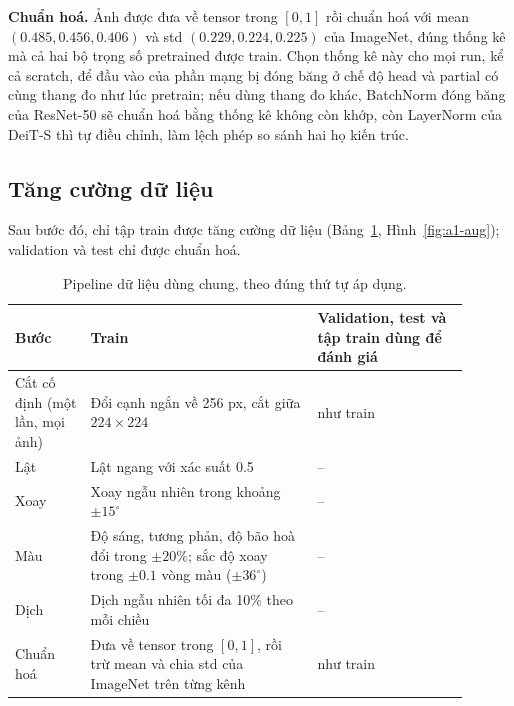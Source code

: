 \documentclass[a4paper,12pt]{article}
\begin{document}
\textbf{Chuẩn hoá.} Ảnh được đưa về tensor trong \([0,1]\) rồi chuẩn hoá với mean \((0.485, 0.456, 0.406)\) và std \((0.229, 0.224, 0.225)\) của ImageNet, đúng thống kê mà cả hai bộ trọng số pretrained được train. Chọn thống kê này cho mọi run, kể cả scratch, để đầu vào của phần mạng bị đóng băng ở chế độ head và partial có cùng thang đo như lúc pretrain; nếu dùng thang đo khác, BatchNorm đóng băng của ResNet-50 sẽ chuẩn hoá bằng thống kê không còn khớp, còn LayerNorm của DeiT-S thì tự điều chỉnh, làm lệch phép so sánh hai họ kiến trúc.

\subsection{Tăng cường dữ liệu}
Sau bước đó, chỉ tập train được tăng cường dữ liệu (Bảng~\ref{tab:a1-pipeline}, Hình~\ref{fig:a1-aug}); validation và test chỉ được chuẩn hoá.

\begin{table}[!htbp]
    \centering
    \small
    \begin{tabular}{p{0.15\linewidth}p{0.45\linewidth}p{0.30\linewidth}}
        \toprule
        Bước                           & Train                                                                                                          & Validation, test và tập train dùng để đánh giá \\
        \midrule
        Cắt cố định (một lần, mọi ảnh) & Đổi cạnh ngắn về 256 px, cắt giữa \(224\times224\)                                                             & như train                                      \\
        Lật                            & Lật ngang với xác suất 0.5                                                                                     & --                                             \\
        Xoay                           & Xoay ngẫu nhiên trong khoảng \(\pm15^\circ\)                                                                   & --                                             \\
        Màu                            & Độ sáng, tương phản, độ bão hoà đổi trong \(\pm20\%\); sắc độ xoay trong \(\pm0.1\) vòng màu (\(\pm36^\circ\)) & --                                             \\
        Dịch                           & Dịch ngẫu nhiên tối đa 10\% theo mỗi chiều                                                                     & --                                             \\
        Chuẩn hoá                      & Đưa về tensor trong \([0,1]\), rồi trừ mean và chia std của ImageNet trên từng kênh                            & như train                                      \\
        \bottomrule
    \end{tabular}
    \caption{Pipeline dữ liệu dùng chung, theo đúng thứ tự áp dụng.}
    \label{tab:a1-pipeline}
\end{table}
\end{document}
